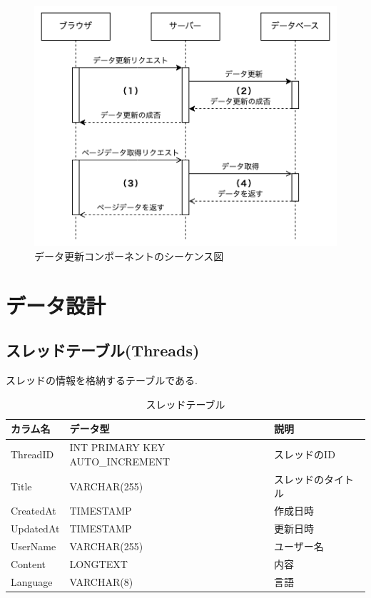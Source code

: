 \documentclass[b5paper,12pt,dvipdfmx]{jsreport}
\begin{document}
\begin{figure}[H]
    \centering
    \includegraphics[width=\textwidth]{./img/components/data_update_component_sequence_diagram.png}
    \caption{データ更新コンポーネントのシーケンス図}
    \label{data_update_component_sequence_diagram}
\end{figure}


\section{データ設計}

\subsection*{スレッドテーブル(Threads)}

スレッドの情報を格納するテーブルである.

\begin{table}[H]
    \centering
    \caption{スレッドテーブル}
    \begin{tabular}{|l|l|l|}
        \hline
        \textbf{カラム名} & \textbf{データ型} & \textbf{説明} \\
        \hline
        ThreadID   & INT PRIMARY KEY AUTO\_INCREMENT & スレッドのID \\
        Title      & VARCHAR(255) & スレッドのタイトル \\
        CreatedAt  & TIMESTAMP & 作成日時 \\
        UpdatedAt  & TIMESTAMP & 更新日時 \\
        UserName   & VARCHAR(255) & ユーザー名 \\
        Content    & LONGTEXT & 内容 \\
        Language   & VARCHAR(8) & 言語 \\
        \hline
    \end{tabular}
\end{table}
\end{document}
